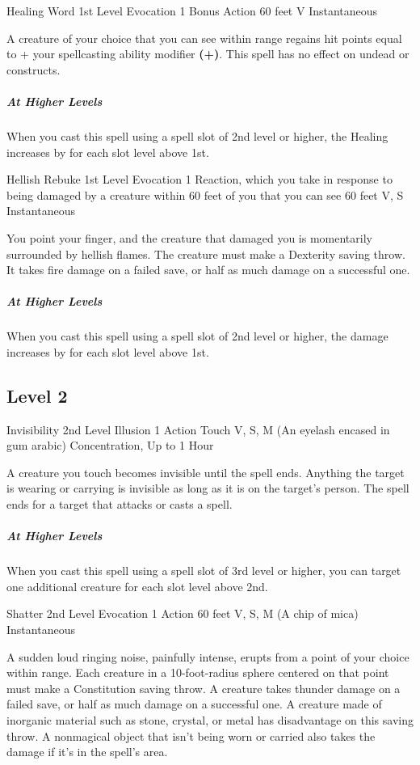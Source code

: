 \documentclass[letterpaper,openany,oneside,twocolumn]{book}
\begin{document}
\DndSpellHeader
  {Healing Word}
  {1st Level Evocation}
  {1 Bonus Action}
  {60 feet}
  {V}
  {Instantaneous}

A creature of your choice that you can see within range regains hit points equal to  + your spellcasting ability modifier \textbf{(+)}. This spell has no effect on undead or constructs.

\subparagraph*{At Higher Levels} When you cast this spell using a spell slot of 2nd level or higher, the Healing increases by  for each slot level above 1st.

\DndSpellHeader
  {Hellish Rebuke}
  {1st Level Evocation}
  {1 Reaction, which you take in response to being damaged by a creature within 60 feet of you that you can see}
  {60 feet}
  {V, S}
  {Instantaneous}

You point your finger, and the creature that damaged you is momentarily surrounded by hellish flames. The creature must make a Dexterity saving throw. It takes  fire damage on a failed save, or half as much damage on a successful one.

\subparagraph*{At Higher Levels} When you cast this spell using a spell slot of 2nd level or higher, the damage increases by  for each slot level above 1st.

\subsection*{Level 2}

\DndSpellHeader
  {Invisibility}
  {2nd Level Illusion}
  {1 Action}
  {Touch}
  {V, S, M (An eyelash encased in gum arabic)}
  {Concentration, Up to 1 Hour}
  
A creature you touch becomes invisible until the spell ends. Anything the target is wearing or carrying is invisible as long as it is on the target’s person. The spell ends for a target that attacks or casts a spell.

\subparagraph*{At Higher Levels} When you cast this spell using a spell slot of 3rd level or higher, you can target one additional creature for each slot level above 2nd.

\DndSpellHeader
  {Shatter}
  {2nd Level Evocation}
  {1 Action}
  {60 feet}
  {V, S, M (A chip of mica)}
  {Instantaneous}

A sudden loud ringing noise, painfully intense, erupts from a point of your choice within range. Each creature in a 10-foot-radius sphere centered on that point must make a Constitution saving throw. A creature takes  thunder damage on a failed save, or half as much damage on a successful one. A creature made of inorganic material such as stone, crystal, or metal has disadvantage on this saving throw. A nonmagical object that isn’t being worn or carried also takes the damage if it’s in the spell’s area.
\end{document}
